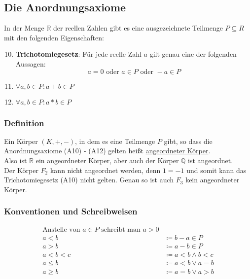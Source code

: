 \documentclass{article}
\begin{document}
\subsection{Die Anordnungsaxiome}

In der Menge $\mathbb{R}$ der reellen Zahlen gibt es eine ausgezeichnete Teilmenge $P \subseteq R$ mit den folgenden
Eigenschaften:

\begin{enumerate}[label=(A\arabic*)]
\setcounter{enumi}{9}
\item \textbf{Trichotomiegesetz}: Für jede reelle Zahl $a$ gilt genau eine der folgenden Aussagen:
  \[
    a = 0 \text{ oder } a \in P \text{ oder } -a \in P
  \]
\item $\forall a,b \in P \colon a + b \in P$
\item $\forall a,b \in P \colon a * b \in P$
\end{enumerate}

\subsubsection{Definition}

Ein Körper $(K, +, -)$, in dem es eine Teilmenge $P$ gibt, so dass die Anordnungsaxiome (A10) - (A12) gelten
heißt \underline{angeordneter Körper}. \\

Also ist $\mathbb{R}$ ein angeordneter Körper, aber auch der Körper $\mathbb{Q}$ ist angeordnet. \\

Der Körper $F_2$ kann nicht angeordnet werden, denn $1 = -1$ und somit kann das Trichotomiegesetz (A10) nicht
gelten. Genau so ist auch $F_3$ kein angeordneter Körper.

\subsubsection{Konventionen und Schreibweisen}

\begin{align*}
  \text{Anstelle von $a \in P$ schreibt man $a > 0$} \\
  a < b &\coloneqq b - a \in P \\
  a > b &\coloneqq a - b \in P \\
  a < b < c &\coloneqq a < b \land b < c \\
  a \leq b &\coloneqq a < b \lor a = b \\
  a \geq b &\coloneqq a = b \lor a > b \\
\end{align*}
\end{document}
